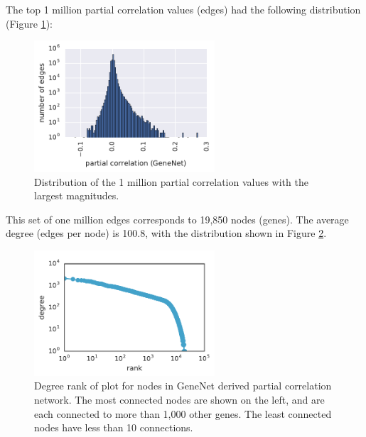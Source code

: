 The top 1 million partial correlation values (edges) had the following distribution (Figure \ref{fig:pcor_hist}):
\begin{figure}[H]
\centering
    \includegraphics[width=0.6\textwidth]{./tex/chapter3/figures/pcor_hist--1e+06_edges.pdf}
    \begin{singlespace}
    \caption[Distribution of the 1 million partial correlation values with the largest magnitudes]{
        Distribution of the 1 million partial correlation values with the largest magnitudes.
        }
    \label{fig:pcor_hist}
    \end{singlespace}
\end{figure}
This set of one million edges corresponds to 19,850 nodes (genes).
The average degree (edges per node) is 100.8, with the distribution shown in Figure \ref{fig:degree_rank}.
\begin{figure}[H]
\centering
    \includegraphics[width=0.6\textwidth]{./tex/chapter3/figures/170406_degree_rank_plot--GeneNet_1e+06_edges--title_deleted_inkscape.pdf}
    \begin{singlespace}
    \caption[Degree rank of plot for nodes in GeneNet derived partial correlation network]{
    	Degree rank of plot for nodes in GeneNet derived partial correlation network.
	The most connected nodes are shown on the left, and are each connected to more than 1,000 other genes.
	The least connected nodes have less than 10 connections.
        }
    \label{fig:degree_rank}
    \end{singlespace}
\end{figure}


